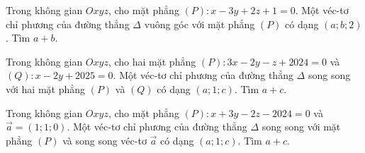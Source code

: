 \begin{ex}%
	Trong không gian $Oxyz$, cho mặt phẳng $(P) \colon x-3y+2z+1=0$.  Một véc-tơ chỉ phương của đường thẳng $\Delta $ vuông góc với mặt phẳng $\left( P \right)$ có dạng $(a;b;2)$. Tìm $a+b$.
\end{ex}


\begin{ex}%
	Trong không gian $Oxyz$, cho hai mặt phẳng $( P) \colon 3x-2y-z+2024=0$ và $(Q) \colon x-2y+2025=0$. Một véc-tơ chỉ phương của đường thẳng $\Delta $ song song với hai mặt phẳng $\left( P \right)$ và $\left( Q \right)$ có dạng $(a;1;c)$. Tìm $a+c$.
\end{ex}
\begin{ex}%
	Trong không gian $Oxyz$, cho mặt phẳng $(P) \colon x+3y-2z-2024=0$ và $\overrightarrow{a}=\left( 1;1;0 \right)$. Một véc-tơ chỉ phương của đường thẳng $\Delta $ song song với mặt phẳng $(P)$ và song song véc-tơ $\overrightarrow{a}$ có dạng $(a;1;c)$. Tìm $a+c$.
\end{ex}
